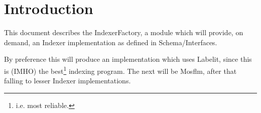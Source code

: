\documentclass[a4paper, 11pt]{article}
\begin{document}
\section{Introduction}

This document describes the IndexerFactory, a module which will provide,
on demand, an Indexer implementation as defined in Schema/Interfaces.

By preference this will produce an implementation which uses Labelit, 
since this is (IMHO) the best\footnote{i.e. most reliable.} indexing 
program. The next will be Mosflm, after that falling to lesser 
Indexer implementations.
\end{document}

